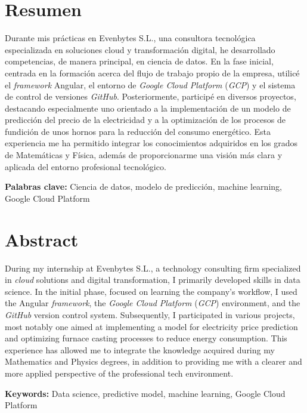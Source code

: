 \section*{Resumen}

Durante mis prácticas en Evenbytes S.L., una consultora tecnológica especializada en soluciones cloud y transformación digital, he desarrollado competencias, de manera principal, en ciencia de datos. En la fase inicial, centrada en la formación acerca del flujo de trabajo propio de la empresa, utilicé el \textit{framework} Angular, el entorno de \textit{Google Cloud Platform} (\textit{GCP}) y el sistema de control de versiones \textit{GitHub}. Posteriormente, participé en diversos proyectos, destacando especialmente uno orientado a la implementación de un modelo de predicción del precio de la electricidad y a la optimización de los procesos de fundición de unos hornos para la reducción del consumo energético. Esta experiencia me ha permitido integrar los conocimientos adquiridos en los grados de Matemáticas y Física, además de proporcionarme una visión más clara y aplicada del entorno profesional tecnológico.

\vspace{1cm}
\noindent\textbf{Palabras clave:} Ciencia de datos, modelo de predicción, machine learning, Google Cloud Platform
 

\section*{Abstract}

During my internship at Evenbytes S.L., a technology consulting firm specialized in \textit{cloud} solutions and digital transformation, I primarily developed skills in data science. In the initial phase, focused on learning the company's workflow, I used the Angular \textit{framework}, the \textit{Google Cloud Platform} (\textit{GCP}) environment, and the \textit{GitHub} version control system. Subsequently, I participated in various projects, most notably one aimed at implementing a model for electricity price prediction and optimizing furnace casting processes to reduce energy consumption. This experience has allowed me to integrate the knowledge acquired during my Mathematics and Physics degrees, in addition to providing me with a clearer and more applied perspective of the professional tech environment.

\vspace{1cm}
\noindent\textbf{Keywords:} Data science,  predictive model, machine learning, Google Cloud Platform

